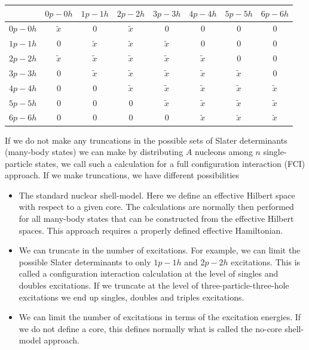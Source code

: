 \begin{table}
\begin{center}
\begin{tabular}{cccccccc}
\hline
\multicolumn{1}{c}{  } & \multicolumn{1}{c}{ $0p-0h$ } & \multicolumn{1}{c}{ $1p-1h$ } & \multicolumn{1}{c}{ $2p-2h$ } & \multicolumn{1}{c}{ $3p-3h$ } & \multicolumn{1}{c}{ $4p-4h$ } & \multicolumn{1}{c}{ $5p-5h$ } & \multicolumn{1}{c}{ $6p-6h$ } \\
\hline
$0p-0h$ & $\tilde{x}$ & 0           & $\tilde{x}$ & 0           & 0           & 0           & 0           \\
$1p-1h$ & 0           & $\tilde{x}$ & $\tilde{x}$ & $\tilde{x}$ & 0           & 0           & 0           \\
$2p-2h$ & $\tilde{x}$ & $\tilde{x}$ & $\tilde{x}$ & $\tilde{x}$ & $\tilde{x}$ & 0           & 0           \\
$3p-3h$ & 0           & $\tilde{x}$ & $\tilde{x}$ & $\tilde{x}$ & $\tilde{x}$ & $\tilde{x}$ & 0           \\
$4p-4h$ & 0           & 0           & $\tilde{x}$ & $\tilde{x}$ & $\tilde{x}$ & $\tilde{x}$ & $\tilde{x}$ \\
$5p-5h$ & 0           & 0           & 0           & $\tilde{x}$ & $\tilde{x}$ & $\tilde{x}$ & $\tilde{x}$ \\
$6p-6h$ & 0           & 0           & 0           & 0           & $\tilde{x}$ & $\tilde{x}$ & $\tilde{x}$ \\
\hline
\end{tabular}
\end{center}
\end{table}
If we do not make any truncations in the possible sets of Slater determinants (many-body states) we can make by distributing $A$ nucleons among $n$ single-particle states, we call such a calculation for a full configuration interaction (FCI) approach. 
If we make truncations, we have different possibilities
\begin{itemize}
\item The standard nuclear shell-model. Here we define an effective Hilbert space with respect to a given core. The calculations are normally then performed for all many-body states that can be constructed from the effective Hilbert spaces. This approach requires a properly defined effective Hamiltonian.

\item We can truncate in the number of excitations. For example, we can limit the possible Slater determinants to only $1p-1h$ and $2p-2h$ excitations. This is called a configuration interaction calculation at the level of singles and doubles excitations. If we truncate at the level of three-particle-three-hole excitations we end up singles, doubles and triples excitations.  

\item We can limit the number of excitations in terms of the excitation energies. If we do not define a core, this defines normally what is called the no-core shell-model approach. 
\end{itemize}

